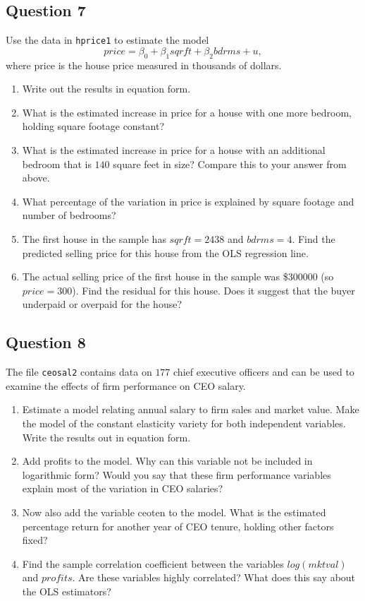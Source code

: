 \documentclass[]{article}
\providecommand{\tightlist}{%
  \setlength{\itemsep}{0pt}\setlength{\parskip}{0pt}}
\begin{document}
\subsection{Question 7}\label{question-7}

Use the data in \texttt{hprice1} to estimate the model
\[price=\beta_0+\beta_1 sqrft+\beta_2 bdrms + u,\] where price is the
house price measured in thousands of dollars.

\begin{enumerate}
\def\labelenumi{\arabic{enumi}.}
\tightlist
\item
  Write out the results in equation form.
\item
  What is the estimated increase in price for a house with one more
  bedroom, holding square footage constant?
\item
  What is the estimated increase in price for a house with an additional
  bedroom that is \(140\) square feet in size? Compare this to your
  answer from above.
\item
  What percentage of the variation in price is explained by square
  footage and number of bedrooms?
\item
  The first house in the sample has \(sqrft=2438\) and \(bdrms=4\). Find
  the predicted selling price for this house from the OLS regression
  line.
\item
  The actual selling price of the first house in the sample was \$300000
  (so \(price=300\)). Find the residual for this house. Does it suggest
  that the buyer underpaid or overpaid for the house?
\end{enumerate}

\subsection{Question 8}\label{question-8}

The file \texttt{ceosal2} contains data on \(177\) chief executive
officers and can be used to examine the effects of firm performance on
CEO salary.

\begin{enumerate}
\def\labelenumi{\arabic{enumi}.}
\tightlist
\item
  Estimate a model relating annual salary to firm sales and market
  value. Make the model of the constant elasticity variety for both
  independent variables. Write the results out in equation form.
\item
  Add profits to the model. Why can this variable not be included in
  logarithmic form? Would you say that these firm performance variables
  explain most of the variation in CEO salaries?
\item
  Now also add the variable ceoten to the model. What is the estimated
  percentage return for another year of CEO tenure, holding other
  factors fixed?
\item
  Find the sample correlation coefficient between the variables
  \(log(mktval)\) and \(profits\). Are these variables highly
  correlated? What does this say about the OLS estimators?
\end{enumerate}
\end{document}
